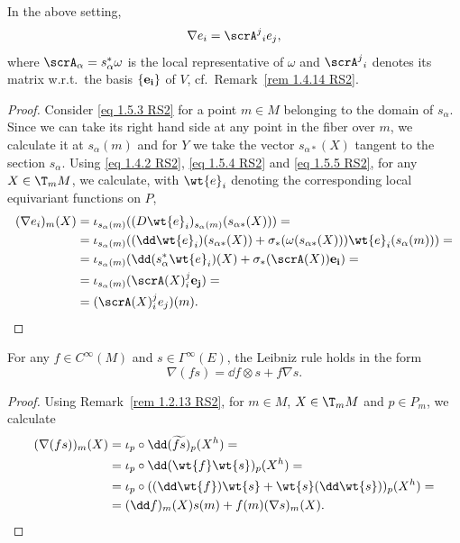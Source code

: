 \begin{prop}[{{\cite[Prop.~1.5.3]{RS2}}}]\label{prop 1.5.3 RS2}
    In the above setting,
    \[\nabla e_i=\scrA^j{}_i e_j,\label{eq 1.5.6 RS2}\]
    where $\scrA_\alpha=s_\alpha^\ast\omega$ is the local representative of $\omega$ and $\scrA^j{}_i$ denotes its matrix w.r.t.\ the basis $\{\bf{e}_i\}$ of $V$, cf.\ Remark~\ref{rem 1.4.14 RS2}.
\end{prop}
\begin{proof}
    Consider \eqref{eq 1.5.3 RS2} for a point $m\in M$ belonging to the domain of $s_\alpha$. Since we can take its right hand side at any point in the fiber over $m$, we calculate it at $s_\alpha(m)$ and for $Y$ we take the vector $s_{\alpha\ast}(X)$ tangent to the section $s_\alpha$. Using \eqref{eq 1.4.2 RS2}, \eqref{eq 1.5.4 RS2} and \eqref{eq 1.5.5 RS2}, for any $X\in \T_mM$, we calculate, with $\wt{e}_i$ denoting the corresponding local equivariant functions on $P$,
    \begin{align}
        (\nabla e_i)_m(X)&=\iota_{s_\alpha(m)}((D\wt{e}_i)_{s_\alpha(m)}(s_{\alpha\ast}(X)))=\notag\\
        &=\iota_{s_\alpha(m)}((\dd\wt{e}_i)(s_{\alpha\ast}(X))+\sigma_\ast(\omega(s_{\alpha\ast}(X)))\wt{e}_i(s_\alpha(m)))=\notag\\
        &=\iota_{s_\alpha(m)}(\dd(s_\alpha^\ast\wt{e}_i)(X)+\sigma_\ast(\scrA(X))\bf{e}_i)=\notag\\
        &=\iota_{s_\alpha(m)}(\scrA(X)^j_i\bf{e}_j)=\notag\\
        &=(\scrA(X)^j_i e_j)(m).
    \end{align}
\end{proof}

\begin{prop}[{{\cite[Prop.~1.5.4]{RS2}}}]\label{prop 1.5.4 RS2}
    For any $f\in C^\infty(M)$ and $s\in\Gamma^\infty(E)$, the Leibniz rule holds in the form
    \[\nabla(f s)=\dd f\otimes s+f\nabla s.\label{eq 1.5.7 RS2}\]
\end{prop}
\begin{proof}
    Using Remark~\ref{rem 1.2.13 RS2}, for $m\in M$, $X\in \T_mM$ and $p\in P_m$, we calculate
    \begin{align}
        (\nabla(fs))_m(X)&=\iota_p\circ \dd(\widetilde{fs})_p (X^h)=\notag\\
        &=\iota_p\circ \dd(\wt{f}\wt{s})_p(X^h)=\notag\\
        &=\iota_p\circ ((\dd\wt{f})\wt{s}+\wt{s}(\dd\wt{s}))_p(X^h)=\notag\\
        &=(\dd f)_m(X)s(m)+f(m)(\nabla s)_m(X).
    \end{align}
\end{proof}

